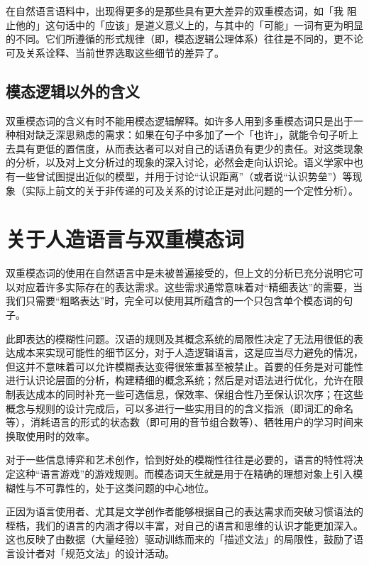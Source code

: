 \documentclass[fontset=ubuntu]{ctexart}
\newcommand{\textul}[1]{\makebox{\underline{#1}}}
\begin{document}
				在自然语言语料中，出现得更多的是那些具有更大差异的双重模态词，如「我 \textul{可能} \textul{应该} 阻止他的」这句话中的「应该」是道义意义上的，与其中的「可能」一词有更为明显的不同。它们所遵循的形式规律（即，模态逻辑公理体系）往往是不同的，更不论可及关系诠释、当前世界选取这些细节的差异了。

			\subsection{模态逻辑以外的含义}

				双重模态词的含义有时不能用模态逻辑解释。如许多人用到多重模态词只是出于一种相对缺乏深思熟虑的需求：如果在句子中多加了一个「也许」，就能令句子听上去具有更低的置信度，从而表达者可以对自己的话语负有更少的责任。对这类现象的分析，以及对上文分析过的现象的深入讨论，必然会走向认识论。语义学家中也有一些曾试图提出近似的模型，并用于讨论“认识距离”（或者说“认识势垒”）等现象（实际上前文的关于非传递的可及关系的讨论正是对此问题的一个定性分析）。

		\section{关于人造语言与双重模态词}
			
			双重模态词的使用在自然语言中是未被普遍接受的，但上文的分析已充分说明它可以对应着许多实际存在的表达需求。这些需求通常意味着对“精细表达”的需要，当我们只需要“粗略表达”时，完全可以使用其所蕴含的一个只包含单个模态词的句子。

			此即表达的模糊性问题。汉语的规则及其概念系统的局限性决定了无法用很低的表达成本来实现可能性的细节区分，对于人造逻辑语言，这是应当尽力避免的情况，但这并不意味着可以允许模糊表达变得很笨重甚至被禁止。首要的任务是对可能性进行认识论层面的分析，构建精细的概念系统；然后是对语法进行优化，允许在限制表达成本的同时补充一些可选信息，保效率、保组合性乃至保认识次序；在这些概念与规则的设计完成后，可以多进行一些实用目的的含义指派（即词汇的命名等），消耗语言的形式的状态数（即可用的音节组合数等）、牺牲用户的学习时间来换取使用时的效率。
			
			对于一些信息博弈和艺术创作，恰到好处的模糊性往往是必要的，语言的特性将决定这种“语言游戏”的游戏规则。而模态词天生就是用于在精确的理想对象上引入模糊性与不可靠性的，处于这类问题的中心地位。

			正因为语言使用者、尤其是文学创作者能够根据自己的表达需求而突破习惯语法的桎梏，我们的语言的内涵才得以丰富，对自己的语言和思维的认识才能更加深入。这也反映了由数据（大量经验）驱动训练而来的「描述文法」的局限性，鼓励了语言设计者对「规范文法」的设计活动。
\end{document}
